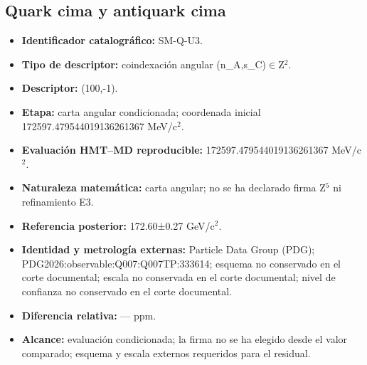 \subsection{Quark cima y antiquark cima}
\begin{itemize}
\item \textbf{Identificador catalográfico:} SM-Q-U3.
\item \textbf{Tipo de descriptor:} coindexación angular (n\_A,s\_C)\(\in\)Z\({}^{2}\).
\item \textbf{Descriptor:} (100,-1).
\item \textbf{Etapa:} carta angular condicionada; coordenada inicial 172597.479544\allowbreak{}019136\allowbreak{}261367 MeV/c\({}^{2}\).
\item \textbf{Evaluación HMT--MD reproducible:} 172597.479544\allowbreak{}019136\allowbreak{}261367 MeV/c\({}^{2}\).
\item \textbf{Naturaleza matemática:} carta angular; no se ha declarado firma Z\({}^{5}\) ni refinamiento E3.
\item \textbf{Referencia posterior:} 172.60±\allowbreak{}0.27 GeV/c\({}^{2}\).
\item \textbf{Identidad y metrología externas:} Particle Data Group (PDG); PDG2026:\allowbreak{}observable:\allowbreak{}Q007:\allowbreak{}Q007TP:\allowbreak{}333614; esquema no conservado en el corte documental; escala no conservada en el corte documental; nivel de confianza no conservado en el corte documental.
\item \textbf{Diferencia relativa:} --- ppm.
\item \textbf{Alcance:} evaluación condicionada; la firma no se ha elegido desde el valor comparado; esquema y escala externos requeridos para el residual.
\end{itemize}
